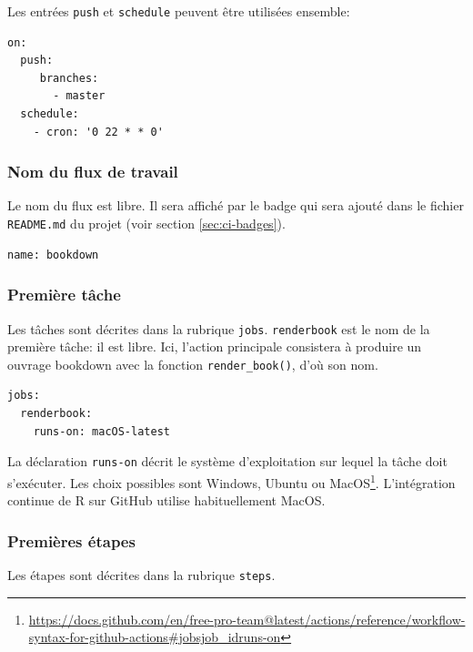 \documentclass[
  11pt,
  french,
  a4paper,
  extrafontsizes,onecolumn,openright
  ]{memoir}
\begin{document}
Les entrées \texttt{push} et \texttt{schedule} peuvent être utilisées ensemble:

\begin{verbatim}
on:
  push:
     branches:
       - master
  schedule:
    - cron: '0 22 * * 0'
\end{verbatim}

\hypertarget{nom-du-flux-de-travail}{%
\subsubsection{Nom du flux de travail}\label{nom-du-flux-de-travail}}

Le nom du flux est libre.
Il sera affiché par le badge qui sera ajouté dans le fichier \texttt{README.md} du projet (voir section \ref{sec:ci-badges}).

\begin{verbatim}
name: bookdown
\end{verbatim}

\hypertarget{premiuxe8re-tuxe2che}{%
\subsubsection{Première tâche}\label{premiuxe8re-tuxe2che}}

Les tâches sont décrites dans la rubrique \texttt{jobs}.
\texttt{renderbook} est le nom de la première tâche: il est libre.
Ici, l'action principale consistera à produire un ouvrage bookdown avec la fonction \texttt{render\_book()}, d'où son nom.

\begin{verbatim}
jobs:
  renderbook:
    runs-on: macOS-latest
\end{verbatim}

La déclaration \texttt{runs-on} décrit le système d'exploitation sur lequel la tâche doit s'exécuter.
Les choix possibles sont Windows, Ubuntu ou MacOS\footnote{\url{https://docs.github.com/en/free-pro-team@latest/actions/reference/workflow-syntax-for-github-actions\#jobsjob_idruns-on}}.
L'intégration continue de R sur GitHub utilise habituellement MacOS.

\hypertarget{premiuxe8res-uxe9tapes}{%
\subsubsection{Premières étapes}\label{premiuxe8res-uxe9tapes}}

Les étapes sont décrites dans la rubrique \texttt{steps}.
\end{document}
